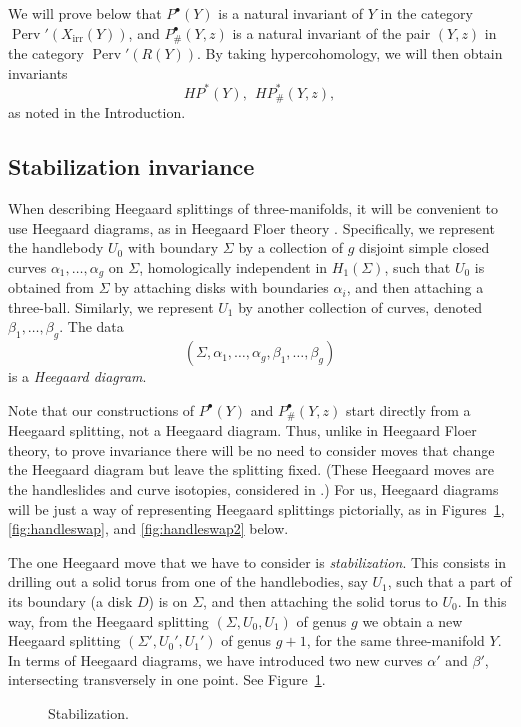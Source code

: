 \documentclass [11pt]{amsart}
\theoremstyle{remark}
\def\HP{\mathit{HP}}
\def\Rep {R}
\def\Char {X}
\def\CharIrr {\Char_{\operatorname{irr}}}
\def\Perv {\operatorname{Perv}}
\def\HPf{\HP_{\! \#}}
\begin{document}
We will prove below that $P^{\bullet}(Y)$ is a natural invariant of $Y$ in the category $\Perv'(\CharIrr(Y))$, and $ P^{\bullet}_\#(Y,z)$  is a natural invariant of the pair $(Y,z)$ in the category $\Perv'(\Rep(Y))$. By taking hypercohomology, we will then obtain invariants
$$ \HP^*(Y),  \ \ \HPf^*(Y,z),$$
as noted in the Introduction.
 

\subsection{Stabilization invariance}
\label{sec:stab}
When describing Heegaard splittings of three-manifolds, it will be convenient to use Heegaard diagrams, as in Heegaard Floer theory \cite{HolDisk}. Specifically, we represent the handlebody $U_0$ with boundary $\Sigma$ by a collection of $g$ disjoint simple closed curves $\alpha_1, \dots, \alpha_g$ on $\Sigma$, homologically independent in $H_1(\Sigma)$, such that $U_0$ is obtained from $\Sigma$ by attaching disks with boundaries $\alpha_i$, and then attaching a three-ball. Similarly, we represent $U_1$ by another collection of curves, denoted $\beta_1, \dots, \beta_g$. The data
$$ (\Sigma, \alpha_1, \dots, \alpha_g, \beta_1, \dots, \beta_g)$$
is a {\em Heegaard diagram}. 

Note that our constructions of $P^{\bullet}(Y)$ and $P^{\bullet}_\#(Y,z)$ start directly from a Heegaard splitting, not a Heegaard diagram. Thus, unlike in Heegaard Floer theory, to prove invariance there will be no need to consider moves that change the Heegaard diagram but leave the splitting fixed. (These Heegaard moves are the handleslides and curve isotopies, considered in \cite{HolDisk}.) For us, Heegaard diagrams will be just a way of representing Heegaard splittings pictorially, as in Figures~\ref{fig:stabilization}, \ref{fig:handleswap}, and \ref{fig:handleswap2} below.

The one Heegaard move that we have to consider is {\em stabilization}. This consists in drilling out a solid torus from one of the handlebodies, say $U_1$, such that a part of its boundary (a disk $D$) is on $\Sigma$, and then attaching the solid torus to $U_0$. In this way, from the Heegaard splitting $(\Sigma, U_0, U_1)$ of genus $g$ we obtain a new Heegaard splitting $(\Sigma', U_0', U_1')$ of genus $g+1$, for the same three-manifold $Y$. In terms of Heegaard diagrams, we have introduced two new curves $\alpha'$ and $\beta'$, intersecting transversely in one point. See Figure~\ref{fig:stabilization}.


\begin {figure}
\begin {center}

\caption {Stabilization.}
\label{fig:stabilization}
\end {center}
\end {figure}
\end{document}
